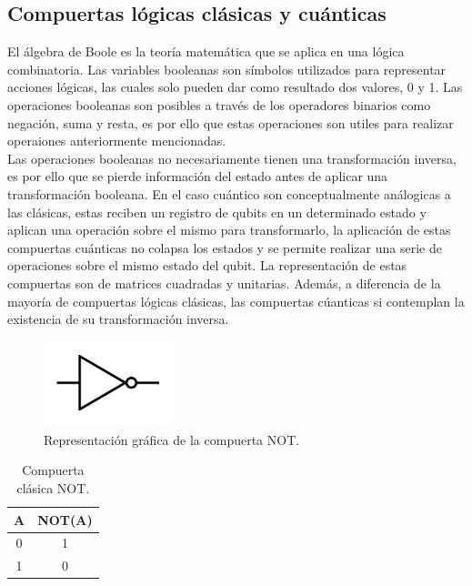 \subsection{Compuertas lógicas clásicas y cuánticas}
El álgebra de Boole es la teoría matemática que se aplica en una lógica combinatoria. Las variables booleanas son símbolos utilizados para representar
acciones lógicas, las cuales solo pueden dar como resultado dos valores, 0 y 1. Las operaciones booleanas son posibles a través de los operadores
binarios como negación, suma y resta, es por ello que estas operaciones son utiles para realizar operaiones anteriormente mencionadas.\\
Las operaciones booleanas no necesariamente tienen una transformación inversa, es por ello que se pierde información del estado antes de aplicar una transformación booleana. En el
caso cuántico son conceptualmente análogicas a las clásicas, estas reciben un registro de qubits en un determinado estado y aplican una operación sobre el mismo para transformarlo,
la aplicación de estas compuertas cuánticas no colapsa los estados y se permite realizar una serie de operaciones sobre el mismo estado del qubit. La 
representación de estas compuertas son de matrices cuadradas y unitarias. Además, a diferencia de la mayoría de compuertas lógicas clásicas, las compuertas cúanticas si 
contemplan la existencia de su transformación inversa.\\
\begin{minipage}{0.5\linewidth}
    \begin{figure}[H]
        \centering
        \includegraphics[height=2.5cm]{images/not.png}
        \caption{Representación gráfica de la compuerta NOT.}
    \end{figure}
    \begin{table}[H]
        \centering
        \begin{tabular}{cc} \hline
            A & NOT(A)\\ \hline
            0 & 1 \\
            1 & 0 \\ \hline
        \end{tabular}
        \caption{Compuerta clásica NOT.}
    \end{table}
\end{minipage}
